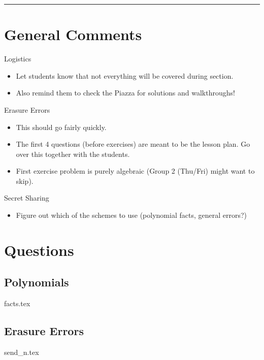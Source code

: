 \documentclass{exam}
\title{}
\date{Polynomials, Secret Sharing, Erasure Errors, General Errors, Self Reference}
\begin{document}
\maketitle
\rule{\textwidth}{0.15em}
\fontsize{12}{15}\selectfont
\thispagestyle{empty}


\section{General Comments}
\begin{questions}
\item Logistics
\begin{itemize}
\item Let students know that not everything will be covered during section. 
\item Also remind them to check the Piazza for solutions and walkthroughs!
\end{itemize}

\item Erasure Errors
\begin{itemize}
\item This should go fairly quickly.
\item The first 4 questions (before exercises) are meant to be the lesson plan. Go over this together with the students.
\item First exercise problem is purely algebraic (Group 2 (Thu/Fri) might want to skip).
\end{itemize}

\item Secret Sharing
\begin{itemize}
\item Figure out which of the schemes to use (polynomial facts, general errors?)
\end{itemize}
\end{questions}

\section{Questions}
\subsection{Polynomials}
\begin{enumerate}
{facts.tex}
\end{enumerate}

\subsection{Erasure Errors}
\begin{enumerate}
{send_n.tex}
\end{enumerate}
\end{document}
